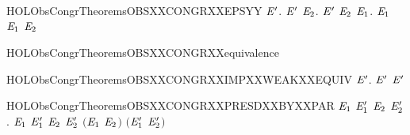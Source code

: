 \newcommand{\HOLObsCongrTheoremsOBSXXCONGRXXEPS}{\UseVerbatim{HOLObsCongrTheoremsOBSXXCONGRXXEPS}}
\begin{SaveVerbatim}{HOLObsCongrTheoremsOBSXXCONGRXXEPSYY}
\HOLTokenTurnstile{} \HOLSymConst{\HOLTokenForall{}} \ensuremath{\HOLBoundVar{E}\sp{\prime}}.
         \ensuremath{\HOLBoundVar{E}\sp{\prime}} \HOLSymConst{\HOLTokenImp{}}
       \HOLSymConst{\HOLTokenForall{}}\ensuremath{\HOLBoundVar{E}\sb{\mathrm{2}}}.  \ensuremath{\HOLBoundVar{E}\sp{\prime}} \ensuremath{\HOLBoundVar{E}\sb{\mathrm{2}}} \HOLSymConst{\HOLTokenImp{}} \HOLSymConst{\HOLTokenExists{}}\ensuremath{\HOLBoundVar{E}\sb{\mathrm{1}}}.   \ensuremath{\HOLBoundVar{E}\sb{\mathrm{1}}} \HOLSymConst{\HOLTokenConj{}}  \ensuremath{\HOLBoundVar{E}\sb{\mathrm{1}}} \ensuremath{\HOLBoundVar{E}\sb{\mathrm{2}}}
\end{SaveVerbatim}
\newcommand{\HOLObsCongrTheoremsOBSXXCONGRXXEPSYY}{\UseVerbatim{HOLObsCongrTheoremsOBSXXCONGRXXEPSYY}}
\begin{SaveVerbatim}{HOLObsCongrTheoremsOBSXXCONGRXXequivalence}
\HOLTokenTurnstile{}  
\end{SaveVerbatim}
\newcommand{\HOLObsCongrTheoremsOBSXXCONGRXXequivalence}{\UseVerbatim{HOLObsCongrTheoremsOBSXXCONGRXXequivalence}}
\begin{SaveVerbatim}{HOLObsCongrTheoremsOBSXXCONGRXXIMPXXWEAKXXEQUIV}
\HOLTokenTurnstile{} \HOLSymConst{\HOLTokenForall{}} \ensuremath{\HOLBoundVar{E}\sp{\prime}}.   \ensuremath{\HOLBoundVar{E}\sp{\prime}} \HOLSymConst{\HOLTokenImp{}}   \ensuremath{\HOLBoundVar{E}\sp{\prime}}
\end{SaveVerbatim}
\newcommand{\HOLObsCongrTheoremsOBSXXCONGRXXIMPXXWEAKXXEQUIV}{\UseVerbatim{HOLObsCongrTheoremsOBSXXCONGRXXIMPXXWEAKXXEQUIV}}
\begin{SaveVerbatim}{HOLObsCongrTheoremsOBSXXCONGRXXPRESDXXBYXXPAR}
\HOLTokenTurnstile{} \HOLSymConst{\HOLTokenForall{}}\ensuremath{\HOLBoundVar{E}\sb{\mathrm{1}}} \ensuremath{\HOLBoundVar{E}\sb{\mathrm{1}}\sp{\prime}} \ensuremath{\HOLBoundVar{E}\sb{\mathrm{2}}} \ensuremath{\HOLBoundVar{E}\sb{\mathrm{2}}\sp{\prime}}.
        \ensuremath{\HOLBoundVar{E}\sb{\mathrm{1}}} \ensuremath{\HOLBoundVar{E}\sb{\mathrm{1}}\sp{\prime}} \HOLSymConst{\HOLTokenConj{}}  \ensuremath{\HOLBoundVar{E}\sb{\mathrm{2}}} \ensuremath{\HOLBoundVar{E}\sb{\mathrm{2}}\sp{\prime}} \HOLSymConst{\HOLTokenImp{}}
        \ensuremath{(}\ensuremath{\HOLBoundVar{E}\sb{\mathrm{1}}} \HOLSymConst{\ensuremath{\mid}} \ensuremath{\HOLBoundVar{E}\sb{\mathrm{2}}}\ensuremath{)} \ensuremath{(}\ensuremath{\HOLBoundVar{E}\sb{\mathrm{1}}\sp{\prime}} \HOLSymConst{\ensuremath{\mid}} \ensuremath{\HOLBoundVar{E}\sb{\mathrm{2}}\sp{\prime}}\ensuremath{)}
\end{SaveVerbatim}
